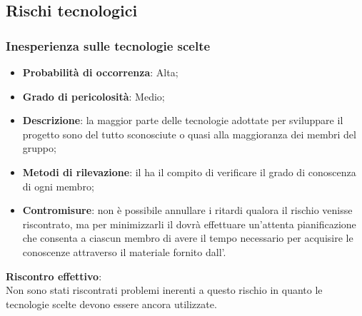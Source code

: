 	\subsection{Rischi tecnologici} %
	\label{sub:rischi_tecnologici}
		\subsubsection{Inesperienza sulle tecnologie scelte} %
		\label{ssub:inesperienza_sulle_tecnlogie_scelte}
			\begin{itemize}
				\item \textbf{Probabilità di occorrenza}: Alta;
				\item \textbf{Grado di pericolosità}: Medio;
				\item \textbf{Descrizione}: la maggior parte delle tecnologie adottate per sviluppare il progetto sono del tutto sconosciute o quasi alla maggioranza dei membri del gruppo;
				\item \textbf{Metodi di rilevazione}: il \roleProjectManager{} ha il compito di verificare il grado di conoscenza di ogni membro;
				\item \textbf{Contromisure}: non è possibile annullare i ritardi qualora il rischio venisse riscontrato, ma per minimizzarli il \roleProjectManager{} dovrà effettuare un'attenta pianificazione che consenta a ciascun membro di avere il tempo necessario per acquisire le conoscenze attraverso il materiale fornito dall'\roleAdministrator.
			\end{itemize}
		\noindent
		\textbf{Riscontro effettivo}: \\
		Non sono stati riscontrati problemi inerenti a questo rischio in quanto le tecnologie scelte devono essere ancora utilizzate.
		
